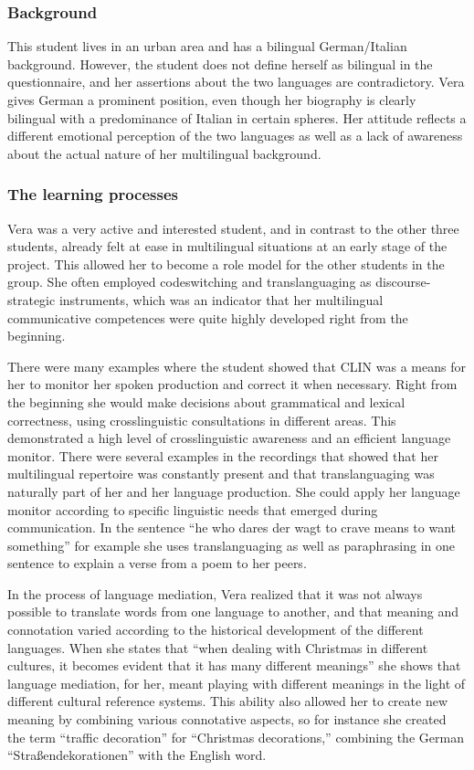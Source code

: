 \documentclass[output=paper]{../langscibook}
\begin{document}
\subsubsection{Background}
This student lives in an urban area and has a bilingual German/Italian background. However, the student does not define herself as bilingual in the questionnaire, and her assertions about the two languages are contradictory. Vera gives German a prominent position, even though her biography is clearly bilingual with a predominance of Italian in certain spheres. Her attitude reflects a different emotional perception of the two languages as well as a lack of awareness about the actual nature of her multilingual background.

\subsubsection{The learning processes}

Vera was a very active and interested student, and in contrast to the other three students, already felt at ease in multilingual situations at an early stage of the project. This allowed her to become a role model for the other students in the group. She often employed codeswitching and translanguaging as discourse-stra\-te\-gic instruments, which was an indicator that her multilingual communicative competences were quite highly developed right from the beginning. 

There were many examples where the student showed that CLIN was a means for her to monitor her spoken production and correct it when necessary. Right from the beginning she would make decisions about grammatical and lexical correctness, using crosslinguistic consultations in different areas. This demonstrated a high level of crosslinguistic awareness and an efficient language monitor. There were several examples in the recordings that showed that her multilingual repertoire was constantly present and that translanguaging was naturally part of her and her language production.  She could apply her language monitor according to specific linguistic needs that emerged during communication. In the sentence “he who dares der wagt to crave means to want something” for example she uses translanguaging as well as paraphrasing in one sentence to explain a verse from a poem to her peers. 

In the process of language mediation, Vera realized that it was not always possible to translate words from one language to another, and that meaning and connotation varied according to the historical development of the different languages. When she states that “when dealing with Christmas in different cultures, it becomes evident that it has many different meanings” she shows that language mediation, for her, meant playing with different meanings in the light of different cultural reference systems. This ability also allowed her to create new meaning by combining various connotative aspects, so for instance she created the term “traffic decoration” for “Christmas decorations,” combining the German “Straßendekorationen” with the English word. 
\end{document}
